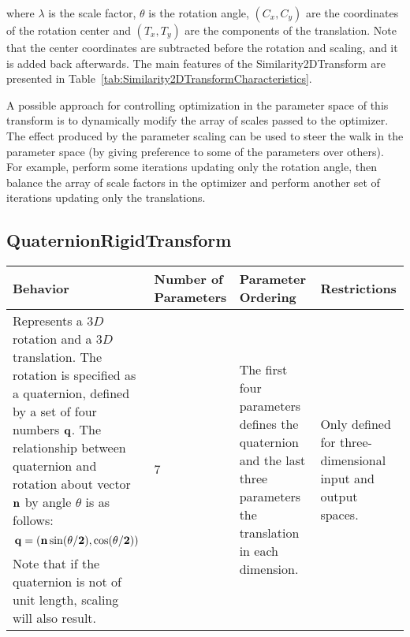 where $\lambda$ is the scale factor, $\theta$ is the rotation angle,
$(C_x,C_y)$ are the coordinates of the rotation center and $(T_x,T_y)$ are
the components of the translation. Note that the center coordinates are
subtracted before the rotation and scaling, and it is added back afterwards.
The main features of the Similarity2DTransform are presented in
Table~\ref{tab:Similarity2DTransformCharacteristics}.


A possible approach for controlling optimization in the parameter space of
this transform is to dynamically modify the array of scales passed to the
optimizer. The effect produced by the parameter scaling can be used to steer
the walk in the parameter space (by giving preference to some of the
parameters over others). For example, perform some iterations updating only
the rotation angle, then balance the array of scale factors in the optimizer
and perform another set of iterations updating only the translations.


\subsection{QuaternionRigidTransform}
\label{sec:QuaternionRigidTransform}

\begin{table}
\begin{center}
\begin{tabular}{| p{4cm} | p{1.8cm} | p{2.5cm} | p{3cm} |}
\hline
\textbf{Behavior} &
\textbf{Number of Parameters} &
\textbf{Parameter Ordering} &
\textbf{Restrictions} \\
\hline\hline
Represents a $3D$ rotation and a $3D$ translation. The rotation is specified as a
quaternion, defined by a set of four numbers $\bf{q}$.  The relationship
between quaternion and rotation about vector $\bf{n}$ by angle $\theta$ is as
follows: \[ \bf{q} = (\bf{n}\sin(\theta/2), \cos(\theta/2))\] Note that if the
quaternion is not of unit length, scaling will also result. &
7 &
The first four parameters defines the quaternion and the last three parameters
the translation in each dimension. &
Only defined for three-dimensional input and output spaces. \\
\hline
\end{tabular}
\end{center}
\end{table}

